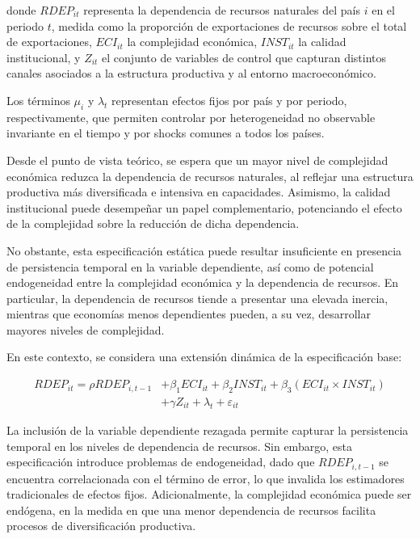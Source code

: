 \documentclass[12pt]{article}
\begin{document}
	donde $RDEP_{it}$ representa la dependencia de recursos naturales del país $i$ en el periodo $t$, medida como la proporción de exportaciones de recursos sobre el total de exportaciones, $ECI_{it}$ la complejidad económica, $INST_{it}$ la calidad institucional, y $Z_{it}$ el conjunto de variables de control que capturan distintos canales asociados a la estructura productiva y al entorno macroeconómico.
	
	Los términos $\mu_i$ y $\lambda_t$ representan efectos fijos por país y por periodo, respectivamente, que permiten controlar por heterogeneidad no observable invariante en el tiempo y por shocks comunes a todos los países.
	
	Desde el punto de vista teórico, se espera que un mayor nivel de complejidad económica reduzca la dependencia de recursos naturales, al reflejar una estructura productiva más diversificada e intensiva en capacidades. Asimismo, la calidad institucional puede desempeñar un papel complementario, potenciando el efecto de la complejidad sobre la reducción de dicha dependencia.
	
	No obstante, esta especificación estática puede resultar insuficiente en presencia de persistencia temporal en la variable dependiente, así como de potencial endogeneidad entre la complejidad económica y la dependencia de recursos. En particular, la dependencia de recursos tiende a presentar una elevada inercia, mientras que economías menos dependientes pueden, a su vez, desarrollar mayores niveles de complejidad.
	
	En este contexto, se considera una extensión dinámica de la especificación base:
	
	\begin{equation}
		\label{eq:modelo_dinamico}
		\begin{split}
			RDEP_{it} = \rho RDEP_{i,t-1} 
			&+ \beta_1 ECI_{it} 
			+ \beta_2 INST_{it} 
			+ \beta_3 (ECI_{it} \times INST_{it}) \\
			&+ \gamma Z_{it}
			+ \lambda_t + \varepsilon_{it}
		\end{split}
	\end{equation}
	
	La inclusión de la variable dependiente rezagada permite capturar la persistencia temporal en los niveles de dependencia de recursos. Sin embargo, esta especificación introduce problemas de endogeneidad, dado que $RDEP_{i,t-1}$ se encuentra correlacionada con el término de error, lo que invalida los estimadores tradicionales de efectos fijos. Adicionalmente, la complejidad económica puede ser endógena, en la medida en que una menor dependencia de recursos facilita procesos de diversificación productiva.
	
\end{document}
